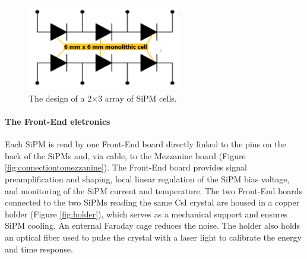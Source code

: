 \begin{figure}[!h]
    \centering
    \includegraphics[width =0.6\textwidth]{figures/png/Screenshot_20240706_141625.png}
    \caption[The design of SiPM cells.]{The design of a 2$\times$3 array of SiPM cells.}
    \label{fig:sipmcell}
\end{figure}
\paragraph{The Front-End eletronics}
Each SiPM is read by one Front-End board directly linked to the pins on the 
back of the SiPMs and, via cable, to the Mezzanine board (Figure \ref{fig:connectiontomezzanine}). 
The Front-End board provides signal preamplification and shaping, local linear 
regulation of the SiPM bias voltage, and monitoring of the SiPM current and temperature. 
The two Front-End boards connected to the two SiPMs reading the same CsI 
crystal are housed in a copper holder (Figure \ref{fig:holder}), which 
serves as a mechanical support and ensures SiPM cooling. 
An enternal Faraday cage reduces the noise. The holder also holds 
an optical fiber used to pulse the crystal with a laser light to 
calibrate the energy and time response.
